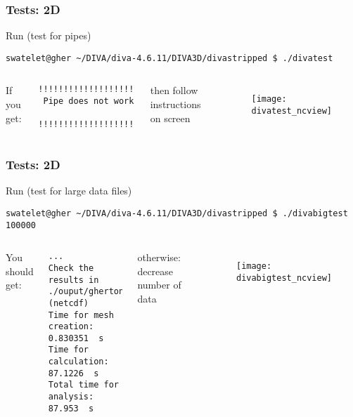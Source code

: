 \begin{frame}[fragile]
\frametitle{Tests: 2D}
\footnotesize

Run \hfill (test for pipes) \Coffeecup
\begin{lstlisting}[style=Bash]
swatelet@gher ~/DIVA/diva-4.6.11/DIVA3D/divastripped $ ./divatest
\end{lstlisting}

\begin{columns}[totalwidth=\textwidth]
If you get:

{\tiny
\begin{verbatim}
!!!!!!!!!!!!!!!!!!!!!!!!!!!!!!!!!!!!!!!!!!!!!!!
 Pipe does not work
 !!!!!!!!!!!!!!!!!!!!!!!!!!!!!!!!!!!!!!!!!!!!!!!
\end{verbatim}
}
then follow instructions on screen

\begin{figure}
\texttt{[image: divatest\_ncview]}
\end{figure}

\end{columns}
\end{frame}

\begin{frame}[fragile]
\frametitle{Tests: 2D}
\footnotesize

Run \hfill (test for large data files) \Coffeecup\Coffeecup\Coffeecup
\begin{lstlisting}[style=Bash]
swatelet@gher ~/DIVA/diva-4.6.11/DIVA3D/divastripped $ ./divabigtest 100000
\end{lstlisting}

\begin{columns}[totalwidth=\textwidth]
You should get:

{\tiny
\begin{verbatim}
...
Check the results in
./ouput/ghertonetcdf/results.nc (netcdf)
Time for mesh creation:   0.830351  s
Time for calculation:     87.1226  s
Total time for analysis:  87.953  s
\end{verbatim}
}
otherwise: decrease number of data

\begin{figure}
\texttt{[image: divabigtest\_ncview]}
\end{figure}

\end{columns}
\end{frame}

